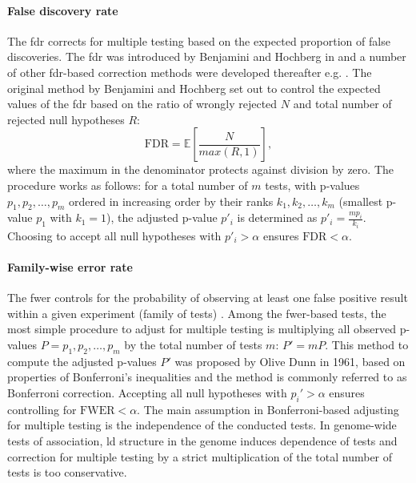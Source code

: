 \paragraph{False discovery rate}
The \gls{fdr} corrects for multiple testing based on the expected proportion of false discoveries. The \gls{fdr} was introduced by Benjamini and Hochberg in \parencite*{Benjamini1995} and a number of other \gls{fdr}-based correction methods were developed thereafter e.g. \citep{Storey2002,Donoho2006,Sarkar2007}. The original method by Benjamini and Hochberg set out to control the expected values of the \gls{fdr} based on the ratio of wrongly rejected \(N\) and total number of rejected null hypotheses \(R\):
\begin{equation}
\text{FDR} = \mathbb{E} \left[\frac{N}{max\left(R,1\right)} \right],
\end{equation}
where the maximum in the denominator protects against division by zero. The procedure works as follows: for a total number of \(m\) tests, with p-values \(p_1, p_2, \dots, p_m\) ordered in increasing order by their ranks  \(k_1, k_2, \dots, k_m\) (smallest p-value \(p_1\) with \(k_1=1\)), the adjusted p-value \(p'_i\) is determined as \(p'_i = \frac{mp_i}{k_i}\). Choosing to accept all null hypotheses with \(p'_i > \alpha\) ensures \(\text{FDR} < \alpha\). 

\paragraph{Family-wise error rate}
The \gls{fwer} controls for the probability of observing at least one false positive result within a given experiment (family of tests) \citep{Shaffer1995}. Among the \gls{fwer}-based tests, the most simple procedure to adjust for multiple testing is multiplying all observed p-values \(P=p_1, p_2, \dots, p_m\) by the total number of tests \(m\): \(P' = mP\). This method to compute the adjusted p-values \(P'\) was proposed by Olive Dunn in 1961, based on properties of Bonferroni's inequalities \citep{Dunn1961} and the method is commonly referred to as Bonferroni correction. Accepting all null hypotheses with \(p_i' > \alpha\) ensures controlling for \(\text{FWER} < \alpha\). The main assumption in Bonferroni-based adjusting for multiple testing is the independence of the conducted tests. In genome-wide tests of association, \gls{ld} structure in the genome induces dependence of tests and correction for multiple testing by a strict multiplication of the total number of tests is too conservative. 

